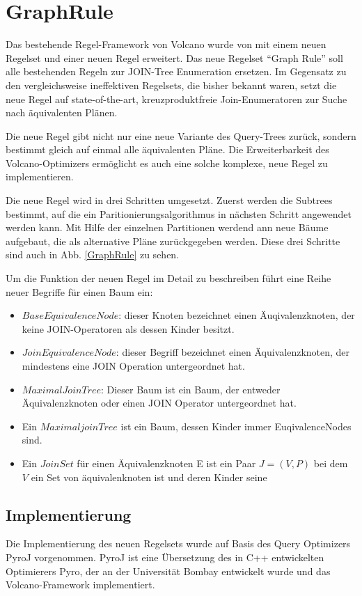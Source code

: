 \section{GraphRule}
Das bestehende Regel-Framework von Volcano wurde von \cite{shanbhag2014optimizing} mit einem neuen Regelset und einer neuen Regel erweitert. Das neue Regelset “Graph Rule” soll alle bestehenden Regeln zur JOIN-Tree Enumeration ersetzen. Im Gegensatz zu den vergleichsweise ineffektiven Regelsets, die bisher bekannt waren, setzt die neue Regel auf state-of-the-art, kreuzproduktfreie Join-Enumeratoren zur Suche nach äquivalenten Plänen.

Die neue Regel gibt nicht nur eine neue Variante des Query-Trees zurück, sondern bestimmt gleich auf einmal alle äquivalenten Pläne. Die Erweiterbarkeit des Volcano-Optimizers ermöglicht es auch eine solche komplexe, neue Regel zu implementieren.

Die neue Regel wird in drei Schritten umgesetzt. Zuerst werden die Subtrees bestimmt, auf die ein Paritionierungsalgorithmus in nächsten Schritt angewendet werden kann. Mit Hilfe der einzelnen Partitionen werdend ann neue Bäume aufgebaut, die als alternative Pläne zurückgegeben werden. Diese drei Schritte sind auch in Abb. \ref{GraphRule} zu sehen.

Um die Funktion der neuen Regel im Detail zu beschreiben führt \cite{shanbhag2014optimizing} eine Reihe neuer Begriffe für einen Baum ein:

\begin{itemize}
\item $Base Equivalence Node$: dieser Knoten bezeichnet einen Äuqivalenzknoten, der keine JOIN-Operatoren als dessen Kinder besitzt.
\item $Join Equivalence Node$: dieser Begriff bezeichnet einen Äquivalenzknoten, der mindestens eine JOIN Operation untergeordnet hat.
\item $Maximal Join Tree$: Dieser Baum ist ein Baum, der entweder Äquivalenzknoten oder einen JOIN Operator untergeordnet hat.
\item Ein $Maximal join Tree$ ist ein Baum, dessen Kinder immer EuqivalenceNodes sind.
\item Ein $Join Set$ für einen Äquivalenzknoten E ist ein Paar $J = (V, P)$ bei dem $V$ ein Set von äquivalenknoten ist und deren Kinder seine 
\end{itemize}


\subsection{Implementierung}
Die Implementierung des neuen Regelsets wurde auf Basis des Query Optimizers PyroJ vorgenommen. PyroJ ist eine Übersetzung des in C++ entwickelten Optimierers Pyro, der an der Universität Bombay entwickelt wurde und das Volcano-Framework implementiert.

